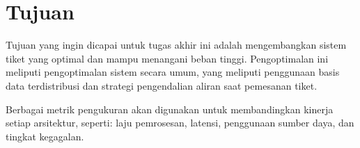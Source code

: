 \section{Tujuan}

Tujuan yang ingin dicapai untuk tugas akhir ini adalah mengembangkan sistem tiket yang optimal dan mampu menangani beban tinggi. Pengoptimalan ini meliputi pengoptimalan sistem secara umum, yang meliputi penggunaan basis data terdistribusi dan strategi pengendalian aliran saat pemesanan tiket.

Berbagai metrik pengukuran akan digunakan untuk membandingkan kinerja setiap arsitektur, seperti: laju pemrosesan, latensi, penggunaan sumber daya, dan tingkat kegagalan.

